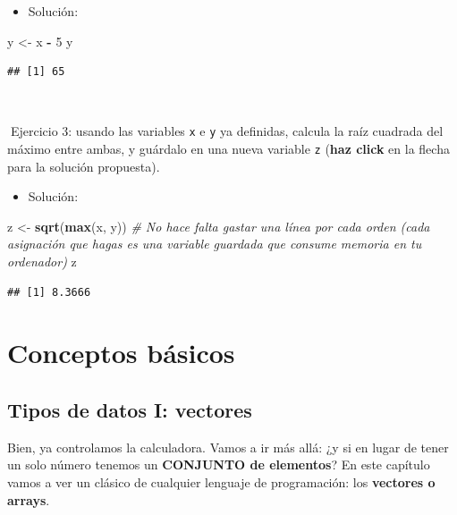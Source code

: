 \documentclass[11pt,]{book}
\newenvironment{Shaded}{\begin{snugshade}}{\end{snugshade}}
\newcommand{\CommentTok}[1]{\textcolor[rgb]{0.37,0.37,0.37}{\textit{#1}}}
\newcommand{\DecValTok}[1]{\textcolor[rgb]{0.06,0.06,0.06}{#1}}
\newcommand{\KeywordTok}[1]{\textcolor[rgb]{0.27,0.27,0.27}{\textbf{#1}}}
\newcommand{\NormalTok}[1]{#1}
\newcommand{\OperatorTok}[1]{\textcolor[rgb]{0.43,0.43,0.43}{\textbf{#1}}}
\newcommand{\StringTok}[1]{\textcolor[rgb]{0.5,0.5,0.5}{#1}}
\providecommand{\tightlist}{%
  \setlength{\itemsep}{0pt}\setlength{\parskip}{0pt}}
\begin{document}
\begin{itemize}
\tightlist
\item
  Solución:
\end{itemize}

\begin{Shaded}
\begin{Highlighting}[]
\NormalTok{y <-}\StringTok{ }\NormalTok{x }\OperatorTok{-}\StringTok{ }\DecValTok{5}
\NormalTok{y}
\end{Highlighting}
\end{Shaded}

\begin{verbatim}
## [1] 65
\end{verbatim}

~

📝Ejercicio 3: usando las variables \texttt{x} e \texttt{y} ya definidas, calcula la raíz cuadrada del máximo entre ambas, y guárdalo en una nueva variable \texttt{z} (\textbf{haz click} en la flecha para la solución propuesta).

\begin{itemize}
\tightlist
\item
  Solución:
\end{itemize}

\begin{Shaded}
\begin{Highlighting}[]
\NormalTok{z <-}\StringTok{ }\KeywordTok{sqrt}\NormalTok{(}\KeywordTok{max}\NormalTok{(x, y)) }\CommentTok{# No hace falta gastar una línea por cada orden (cada asignación que hagas es una variable guardada que consume memoria en tu ordenador)}
\NormalTok{z}
\end{Highlighting}
\end{Shaded}

\begin{verbatim}
## [1] 8.3666
\end{verbatim}

\hypertarget{part-conceptos-buxe1sicos}{%
\part{Conceptos básicos}\label{part-conceptos-buxe1sicos}}

\hypertarget{tipos-de-datos-i-vectores}{%
\chapter{Tipos de datos I: vectores}\label{tipos-de-datos-i-vectores}}

Bien, ya controlamos la calculadora. Vamos a ir más allá: ¿y si en lugar de tener un solo número tenemos un \textbf{CONJUNTO de elementos}? En este capítulo vamos a ver un clásico de cualquier lenguaje de programación: los \textbf{vectores o arrays}.
\end{document}
